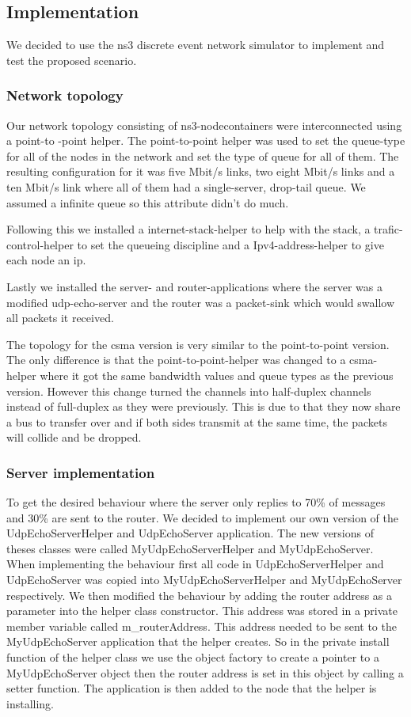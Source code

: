 \documentclass{article}
\begin{document}
\subsection{Implementation}
We decided to use the ns3 discrete event network simulator to implement and test the proposed scenario.



\subsubsection{Network topology}
Our network topology consisting of ns3-nodecontainers were interconnected using a point-to
-point helper. The point-to-point helper was used to set the queue-type for all of the
nodes in the network and set the type of queue for all of them. The resulting configuration
for it was five Mbit/s links, two eight Mbit/s links and a ten Mbit/s link where all of
them had a single-server, drop-tail queue. We assumed a infinite queue so this attribute
didn't do much. 

Following this we installed a internet-stack-helper to help with the stack, a
trafic-control-helper to set the queueing discipline and a Ipv4-address-helper to give each
node an ip. 

Lastly we installed the server- and router-applications where the server was a modified
udp-echo-server and the router was a packet-sink which would swallow all packets it
received. 

The topology for the csma version is very similar to the point-to-point version. The only
difference is that the point-to-point-helper was changed to a csma-helper where it got the
same bandwidth values and queue types as the previous version. However this change turned
the channels into half-duplex channels instead of full-duplex as they were previously. This
is due to that they now share a bus to transfer over and if both sides transmit at the same
time, the packets will collide and be dropped.


\subsubsection{Server implementation}
To get the desired behaviour where the server only replies to 70\% of messages and 30\% are sent to the router.
We decided to implement our own version of the UdpEchoServerHelper and UdpEchoServer application.
The new versions of theses classes were called MyUdpEchoServerHelper and MyUdpEchoServer.
When implementing the behaviour first all code in UdpEchoServerHelper and UdpEchoServer was copied into MyUdpEchoServerHelper and MyUdpEchoServer respectively.
We then modified the behaviour by adding the router address as a parameter into the helper class constructor.
This address was stored in a private member variable called m\_routerAddress.
This address needed to be sent to the MyUdpEchoServer application that the helper creates.
So in the private install function of the helper class we use the object factory to create a pointer to a MyUdpEchoServer object then the router address is set in this object by calling a setter function.
The application is then added to the node that the helper is installing.
\end{document}
